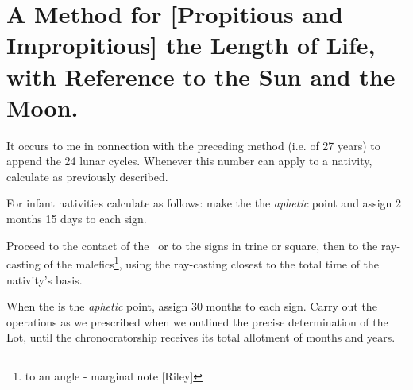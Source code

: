 \section{A Method for [Propitious and Impropitious] the Length of Life, with Reference to the Sun and the Moon.}

It occurs to me in connection with the preceding method (i.e. of 27 years) to append the 24 lunar cycles. Whenever this number can apply to a nativity, calculate as previously described. 

For infant nativities calculate as follows: make the \Moon\xspace the \textit{aphetic} point and assign 2 months 15 days to each sign.

Proceed to the contact of the \Moon\, or to the signs in trine or square, then to the ray-casting of the malefics\footnote{to an angle - marginal note [Riley]}, using the ray-casting closest to the total time of the nativity’s basis. 

When the \Sun\xspace is the \textit{aphetic} point, assign 30 months to each sign. Carry out the operations as we prescribed when we outlined
the precise determination of the Lot, until the chronocratorship receives its total allotment of months and years.

\newpage